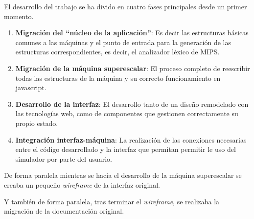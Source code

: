 El desarrollo del trabajo se ha divido en cuatro fases principales desde un
primer momento.

\begin{enumerate}
   \item \textbf{Migración del “núcleo de la aplicación”}: Es decir las estructuras básicas 
   comunes a las máquinas y el punto de entrada para la generación de las estructuras 
   correspondientes, es decir, el analizador léxico de MIPS.

   \item \textbf{Migración de la máquina superescalar}: El proceso completo de reescribir 
   todas las estructuras de la máquina y su correcto funcionamiento en javascript.

   \item \textbf{Desarrollo de la interfaz}: El desarrollo tanto de un diseño remodelado 
   con las tecnologías web, como de componentes que gestionen correctamente su propio estado.
   
   \item \textbf{Integración interfaz-máquina}: La realización de las conexiones necesarias entre el 
   código desarrollado y la interfaz que permitan permitir le uso del simulador por parte del usuario.

\end{enumerate}

De forma paralela mientras se hacia el desarrollo de la máquina superescalar se creaba 
un pequeño \textit{wireframe} de la interfaz original. 

\bigskip
Y también de forma paralela, tras terminar el \textit{wireframe}, se realizaba la migración 
de la documentación original.